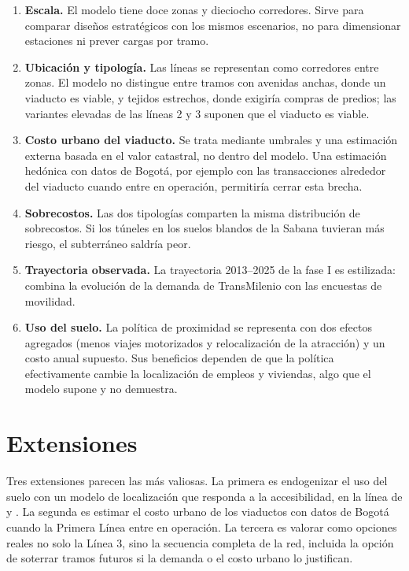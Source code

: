 \begin{enumerate}
\item \textbf{Escala.} El modelo tiene doce zonas y dieciocho corredores. Sirve para comparar diseños
      estratégicos con los mismos escenarios, no para dimensionar estaciones ni prever cargas por tramo.
\item \textbf{Ubicación y tipología.} Las líneas se representan como corredores entre zonas. El modelo
      no distingue entre tramos con avenidas anchas, donde un viaducto es viable, y tejidos estrechos,
      donde exigiría compras de predios; las variantes elevadas de las líneas 2 y 3 suponen que el
      viaducto es viable.
\item \textbf{Costo urbano del viaducto.} Se trata mediante umbrales y una estimación externa basada en
      el valor catastral, no dentro del modelo. Una estimación hedónica con datos de Bogotá, por ejemplo
      con las transacciones alrededor del viaducto cuando entre en operación, permitiría cerrar esta
      brecha.
\item \textbf{Sobrecostos.} Las dos tipologías comparten la misma distribución de sobrecostos. Si los
      túneles en los suelos blandos de la Sabana tuvieran más riesgo, el subterráneo saldría peor.
\item \textbf{Trayectoria observada.} La trayectoria 2013--2025 de la fase I es estilizada: combina
      la evolución de la demanda de TransMilenio con las encuestas de movilidad.
\item \textbf{Uso del suelo.} La política de proximidad se representa con dos efectos agregados
      (menos viajes motorizados y relocalización de la atracción) y un costo anual supuesto. Sus
      beneficios dependen de que la política efectivamente cambie la localización de empleos y
      viviendas, algo que el modelo supone y no demuestra.
\end{enumerate}

\section{Extensiones}

Tres extensiones parecen las más valiosas. La primera es endogenizar el uso del suelo con un modelo de
localización que responda a la accesibilidad, en la línea de \citet{alonso1964} y \citet{muth1969}.
La segunda es estimar el costo urbano de los viaductos con datos de Bogotá cuando la Primera Línea
entre en operación. La tercera es valorar como opciones reales no solo la Línea 3, sino la secuencia
completa de la red, incluida la opción de soterrar tramos futuros si la demanda o el costo urbano lo
justifican.
